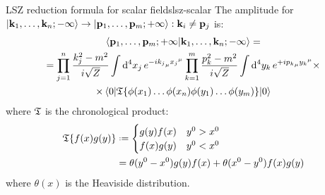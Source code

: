 \begin{theorem}{LSZ reduction formula for scalar fields}{lsz-scalar}
  The amplitude for $ \ket{\mathbf{k}_1 , \dots , \mathbf{k}_n; -\infty} \rightarrow \ket{\mathbf{p}_1 , \dots , \mathbf{p}_m; +\infty} : \mathbf{k}_i \neq \mathbf{p}_j $ is:
  \begin{multline}
    \braket{\mathbf{p}_1 , \dots , \mathbf{p}_m ; +\infty | \mathbf{k}_1 , \dots , \mathbf{k}_n ; -\infty} = \\
    = \prod_{j = 1}^n \frac{k_j^2 - m^2}{i \sqrt{Z}} \int \mathrm{d}^4x_j\, e^{-i {k_j}_\mu {x_j}^\mu} \prod_{k = 1}^m \frac{p_k^2 - m^2}{i \sqrt{Z}} \int \mathrm{d}^4y_k\, e^{+i {p_k}_\mu {y_k}^\mu} \times \\
    \times \braket{0 | \mathfrak{T}\{\phi(x_1) \dots \phi(x_n) \phi(y_1) \dots \phi(y_m)\} | 0}
    \label{eq:lsz-scalar-field}
  \end{multline}
  where $ \mathfrak{T} $ is the chronological product:
  \begin{equation}
    \begin{split}
      \tempord\{f(x) g(y)\} & \defeq
      \begin{cases}
        g(y) f(x) & y^0 > x^0 \\
        f(x) g(y) & y^0 < x^0
      \end{cases} \\
      & = \theta(y^0 - x^0) g(y) f(x) + \theta(x^0 - y^0) f(x) g(y)
    \end{split}
  \end{equation}
  where $ \theta(x) $ is the Heaviside distribution.
\end{theorem}

